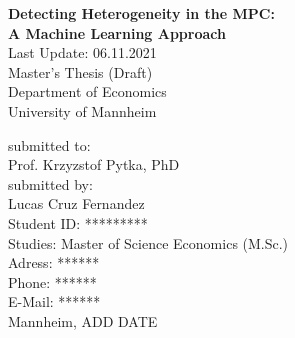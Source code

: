 \begin{titlepage}

\begin{center}

\vspace*{1,2cm}

\Large {\bfseries Detecting Heterogeneity in the MPC: \\ A Machine Learning Approach}\\[2cm]
\large {Last Update: 06.11.2021}\\[1cm]

\large {Master's Thesis (Draft)}\\[1cm]
\large {Department of Economics}\\[0.2cm]

\large {University of Mannheim}\\[0.5cm]

\end{center}

\vfill

\noindent submitted to:\\
Prof. Krzyzstof Pytka, PhD\\[0.5cm]
submitted by:\\
Lucas Cruz Fernandez\\[0.5cm]
Student ID: *********\\
Studies: Master of Science Economics (M.Sc.)\\[0.5cm]
Adress: ****** \\
Phone: ****** \\
E-Mail: ****** \\[0.5cm]
Mannheim, ADD DATE

\setcounter{page}{0}

\end{titlepage}
